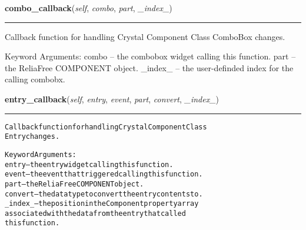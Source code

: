     \label{reliafree:miscellaneous:crystal:Crystal:combo_callback}

    \vspace{0.5ex}

\hspace{.8\funcindent}\begin{boxedminipage}{\funcwidth}

    \raggedright \textbf{combo\_callback}(\textit{self}, \textit{combo}, \textit{part}, \textit{\_index\_})

    \vspace{-1.5ex}

    \rule{\textwidth}{0.5\fboxrule}
\setlength{\parskip}{2ex}
    Callback function for handling Crystal Component Class ComboBox 
    changes.

    Keyword Arguments: combo   -- the combobox widget calling this 
    function. part    -- the ReliaFree COMPONENT object. \_index\_ -- the 
    user-definded index for the calling combobx.

\setlength{\parskip}{1ex}
    \end{boxedminipage}

    \label{reliafree:miscellaneous:crystal:Crystal:entry_callback}

    \vspace{0.5ex}

\hspace{.8\funcindent}\begin{boxedminipage}{\funcwidth}

    \raggedright \textbf{entry\_callback}(\textit{self}, \textit{entry}, \textit{event}, \textit{part}, \textit{convert}, \textit{\_index\_})

    \vspace{-1.5ex}

    \rule{\textwidth}{0.5\fboxrule}
\setlength{\parskip}{2ex}
\begin{alltt}
Callback function for handling Crystal Component Class
Entry changes.

Keyword Arguments:
entry   -- the entry widget calling this function.
event   -- the event that triggered calling this function.
part    -- the ReliaFree COMPONENT object.
convert -- the data type to convert the entry contents to.
\_index\_ -- the position in the Component property array
           associated with the data from the entry that called
           this function.
\end{alltt}

\setlength{\parskip}{1ex}
    \end{boxedminipage}

